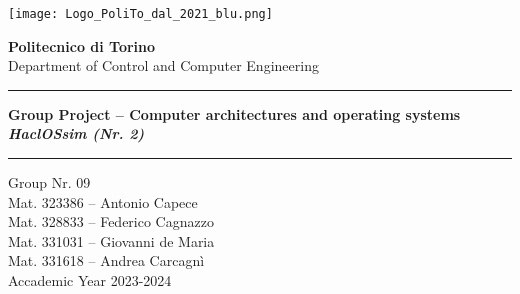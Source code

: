 \documentclass[a4paper, 10pt, oneside]{article} %
\begin{document}
\pagestyle{fancy}
	\fancyhf{}
	\fancyhead[C]{}
	\renewcommand{\headrulewidth}{0.4pt}
	\fancyfoot[C]{\thepage}
	\renewcommand{\footrulewidth}{0.4pt}

	\thispagestyle{empty}	
{
	\centering 
	
	\vspace*{\baselineskip} %
	\vspace*{1cm}

    \texttt{[image: Logo\_PoliTo\_dal\_2021\_blu.png]}

	\vspace*{1cm}

    \LARGE
	\textbf{Politecnico di Torino}\\
    Department of Control and Computer Engineering
	\bigskip\bigskip
	
	\rule{\textwidth}{1.6pt}\vspace*{2pt} %
	
	\vspace{0.75\baselineskip} %
	
	{\LARGE \textbf{Group Project -- Computer architectures and operating systems}\\
 \medskip
 \textbf{\textit{HaclOSsim (Nr. 2)}}} %
 
	\Large
	\vspace{0.75\baselineskip} %
	
	\rule{\textwidth}{1.6pt}\vspace*{2pt} %

	\vspace{2\baselineskip} %

        Group Nr. 09\\
        
    \vspace{2cm}
       Mat. 323386 -- Antonio Capece \\
	\medskip
       Mat. 328833 -- Federico Cagnazzo \\
	\medskip
       Mat. 331031 -- Giovanni de Maria \\
    \medskip
       Mat. 331618 -- Andrea Carcagnì \\
	\vspace{3cm}
	Accademic Year 2023-2024\\
    
	

	}
\newpage
\tableofcontents
\newpage
\end{document}
